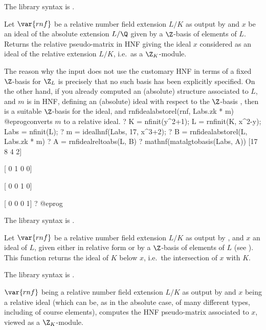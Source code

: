 The library syntax is .

\label{se:rnfidealabstorel}
Let $\var{rnf}$ be a relative
number field extension $L/K$ as output by  and $x$ be an ideal of
the absolute extension $L/\Q$ given by a $\Z$-basis of elements of $L$.
Returns the relative pseudo-matrix in HNF giving the ideal $x$ considered as
an ideal of the relative extension $L/K$, i.e.~as a $\Z_K$-module.

The reason why the input does not use the customary HNF in terms of a fixed
$\Z$-basis for $\Z_L$ is precisely that no such basis has been explicitly
specified. On the other hand, if you already computed an (absolute) 
structure  associated to $L$, and $m$ is in HNF, defining
an (absolute) ideal with respect to the $\Z$-basis , then
 is a suitable $\Z$-basis for the ideal, and
\bprog
  rnfidealabstorel(rnf, Labs.zk * m)
@eprog\noindent converts $m$ to a relative ideal.
\bprog
? K = nfinit(y^2+1); L = rnfinit(K, x^2-y); Labs = nfinit(L);
? m = idealhnf(Labs, 17, x^3+2);
? B = rnfidealabstorel(L, Labs.zk * m)
? A = rnfidealreltoabs(L, B)
? mathnf(matalgtobasis(Labs, A))
[17 8 4 2]

[ 0 1 0 0]

[ 0 0 1 0]

[ 0 0 0 1]
? %
@eprog

The library syntax is .

\label{se:rnfidealdown}
Let $\var{rnf}$ be a relative number
field extension $L/K$ as output by , and $x$ an ideal of
$L$, given either in relative form or by a $\Z$-basis of elements of $L$
(see ). This function returns the ideal of $K$
below $x$, i.e.~the intersection of $x$ with $K$.

The library syntax is .

\label{se:rnfidealhnf}
$\var{rnf}$ being a relative number
field extension $L/K$ as output by  and $x$ being a relative
ideal (which can be, as in the absolute case, of many different types,
including of course elements), computes the HNF pseudo-matrix associated to
$x$, viewed as a $\Z_K$-module.

